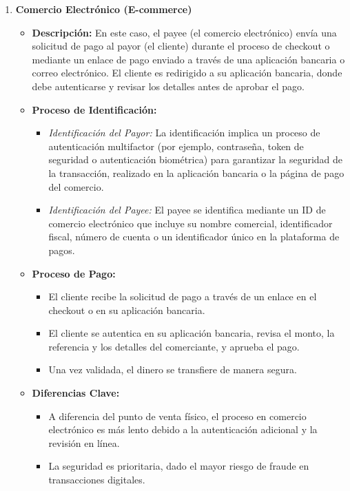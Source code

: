 \begin{enumerate}
    \item \textbf{Comercio Electrónico (E-commerce)}
    \begin{itemize}
        \item \textbf{Descripción:} En este caso, el payee (el comercio electrónico) envía una solicitud de pago al payor (el cliente) durante el proceso de checkout o mediante un enlace de pago enviado a través de una aplicación bancaria o correo electrónico. El cliente es redirigido a su aplicación bancaria, donde debe autenticarse y revisar los detalles antes de aprobar el pago.
        \item \textbf{Proceso de Identificación:}
        \begin{itemize}
            \item \textit{Identificación del Payor:} La identificación implica un proceso de autenticación multifactor (por ejemplo, contraseña, token de seguridad o autenticación biométrica) para garantizar la seguridad de la transacción, realizado en la aplicación bancaria o la página de pago del comercio.
            \item \textit{Identificación del Payee:} El payee se identifica mediante un ID de comercio electrónico que incluye su nombre comercial, identificador fiscal, número de cuenta o un identificador único en la plataforma de pagos.
        \end{itemize}
        \item \textbf{Proceso de Pago:}
        \begin{itemize}
            \item El cliente recibe la solicitud de pago a través de un enlace en el checkout o en su aplicación bancaria.
            \item El cliente se autentica en su aplicación bancaria, revisa el monto, la referencia y los detalles del comerciante, y aprueba el pago.
            \item Una vez validada, el dinero se transfiere de manera segura.
        \end{itemize}
        \item \textbf{Diferencias Clave:}
        \begin{itemize}
            \item A diferencia del punto de venta físico, el proceso en comercio electrónico es más lento debido a la autenticación adicional y la revisión en línea.
            \item La seguridad es prioritaria, dado el mayor riesgo de fraude en transacciones digitales.
        \end{itemize}
    \end{itemize}


\end{enumerate}
